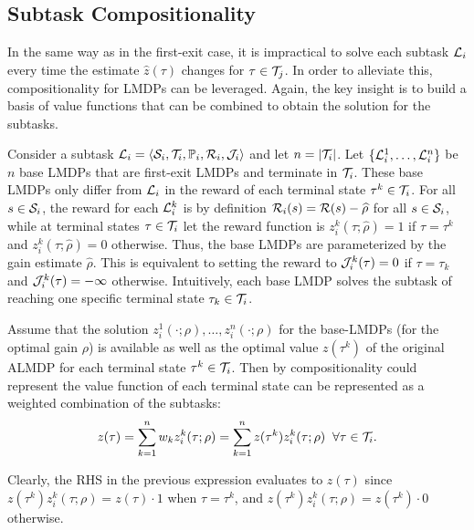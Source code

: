 \subsection{Subtask Compositionality}
In the same way as in the first-exit case, it is impractical to solve each subtask $\mathcal{L}_i$ every time the estimate $\widehat z(\tau)$ changes for $\tau\in\mathcal{T}_j$. In order to alleviate this, compositionality for LMDPs can be leveraged. Again, the key insight is to build a basis of value functions that can be combined to obtain the solution for the subtasks.

Consider a subtask $\mathcal{L}_i=\langle\mathcal{S}_i,\mathcal{T}_i,\mathbb{P}_i,\mathcal{R}_i,\mathcal{J}_i\rangle$ and let $n=|\mathcal{T}_i|$.  Let $\{\mathcal{L}_i^1,\ldots,\mathcal{L}_i^n\}$ be $n$ base LMDPs that are first-exit LMDPs and terminate in $\mathcal{T}_i$. These base LMDPs only differ from $\mathcal{L}_i$ in the reward of each terminal state $\tau^k\in\mathcal{T}_i$. For all $s\in\mathcal{S}_i$, the reward for each $\mathcal{L}_i^k$ is by definition $\mathcal{R}_i(s)=\mathcal{R}(s)-\widehat\rho$ for all $s\in\mathcal{S}_i$, while at terminal states $\tau\in\mathcal{T}_i$ let the reward function is $z_i^k(\tau;\widehat\rho)=1$ if $\tau=\tau^k$ and $z_i^k(\tau;\widehat\rho)=0$ otherwise. Thus, the base LMDPs are parameterized by the gain estimate $\widehat\rho$. This is equivalent to setting the reward to $\mathcal{J}_i^k(\tau)=0$ if $\tau=\tau_k$ and $\mathcal{J}_i^k(\tau)=-\infty$ otherwise. Intuitively, each base LMDP solves the subtask of reaching one specific terminal state $\tau_k\in\mathcal{T}_i$.

Assume that the solution $z_i^1(\cdot;\rho),\ldots,z_i^n(\cdot;\rho)$ for the base-LMDPs (for the optimal gain $\rho$) is available as well as the optimal value $z(\tau^k)$ of the original ALMDP for each terminal state $\tau^k\in\mathcal{T}_i$. Then by compositionality could represent the value function of each terminal state can be represented as a weighted combination of the subtasks:
\begin{equation}
  z(\tau) = \sum_{k=1}^n w_k z_i^k(\tau;\rho) =  \sum_{k=1}^n z(\tau^k) z_i^k(\tau;\rho) \;\;\forall\tau\in\mathcal{T}_i.
  \label{eq:comp_terminal}
\end{equation}

Clearly, the RHS in the previous expression evaluates to $z(\tau)$ since $z(\tau^k) z_i^k(\tau;\rho) = z(\tau)\cdot 1$ when $\tau = \tau^k$, and
$z(\tau^k) z_i^k(\tau;\rho) = z(\tau^k)\cdot 0$ otherwise.

